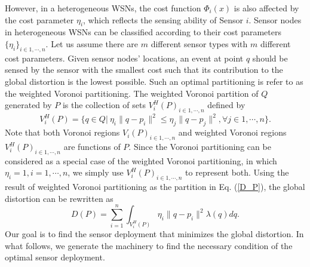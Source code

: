 \documentclass[journal,draftcls,onecolumn,12pt,twoside, narroweqnarray]{IEEEtran}
\begin{document}
However, in a heterogeneous WSNs, the cost function $\Phi_i(x)$ is also affected by the cost parameter $\eta_i$, which reflects the sensing ability of Sensor $i$. Sensor nodes in heterogeneous WSNs can be classified according to their cost parameters $\{\eta_i\}_{i\in1,\cdots,n}$. Let us assume there are $m$ different sensor types with $m$ different cost parameters. Given sensor nodes' locations, an event at point $q$ should be sensed by the sensor with the smallest cost such that its contribution to the global distortion is the lowest possible. Such an optimal partitioning  is refer to as the weighted Voronoi partitioning. The weighted Voronoi partition of $Q$ generated by $P$ is the collection of sets ${V^H_i(P)}_{i\in{1,\cdots,n}}$ defined by
\begin{equation}
\label{df weighted Voronoi partition}
V^H_i(P)=\{q \in Q |\ \eta_i\|q-p_i\|^2 \le \eta_j\|q-p_j\|^2, \forall j \in 1,\cdots,n\}.
\end{equation}
Note that both Voronoi regions $V_i(P)_{i\in1,\cdots,n}$ and weighted Voronoi regions $V^H_i(P)_{i\in1,\cdots,n}$ are functions of $P$. Since the Voronoi partitioning can be considered as a special case of the weighted Voronoi partitioning, in which $\eta_i=1,i=1,\cdots,n$, we simply use $V^H_i(P)_{i\in1,\cdots,n}$ to represent both. Using the result of weighted Voronoi partitioning as the partition in Eq. (\ref{D_P}), the global distortion can be rewritten as
\begin{equation}
D(P) = \sum_{i=1}^n \int_{V^H_i(P)} \eta_i\|q-p_i\|^2 \lambda(q)dq.
\end{equation}
Our goal is to find the sensor deployment that minimizes the global distortion. In what follows, we generate the machinery to find the necessary condition of the optimal sensor deployment.
\end{document}
